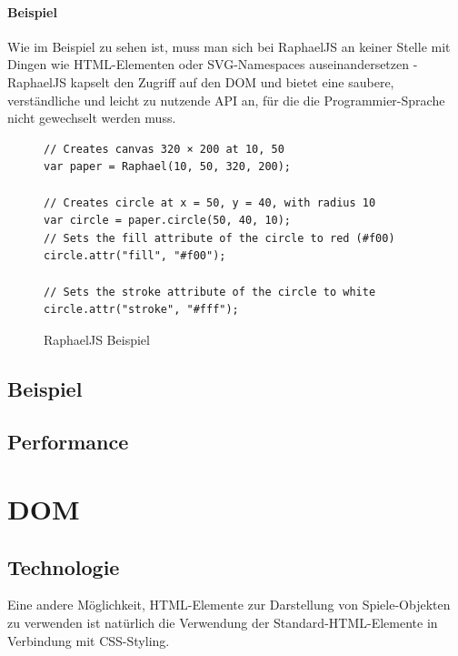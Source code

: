 \documentclass[a4paper, 12pt]{article}
\begin{document}
\paragraph{Beispiel}
Wie im Beispiel zu sehen ist, muss man sich bei RaphaelJS an keiner Stelle mit Dingen wie HTML-Elementen oder SVG-Namespaces auseinandersetzen - RaphaelJS kapselt den Zugriff auf den DOM und bietet eine saubere, verständliche und leicht zu nutzende API an, für die die Programmier-Sprache nicht gewechselt werden muss. 
\begin{figure}[h!]
	\begin{verbatim}
// Creates canvas 320 × 200 at 10, 50
var paper = Raphael(10, 50, 320, 200);

// Creates circle at x = 50, y = 40, with radius 10
var circle = paper.circle(50, 40, 10);
// Sets the fill attribute of the circle to red (#f00)
circle.attr("fill", "#f00");

// Sets the stroke attribute of the circle to white
circle.attr("stroke", "#fff");	
	\end{verbatim}
	\caption{RaphaelJS Beispiel}
	\label{raphaeljs_example}
\end{figure}
\subsection{Beispiel}
\subsection{Performance}
\newpage
\section{DOM}
\subsection{Technologie}
Eine andere Möglichkeit, HTML-Elemente zur Darstellung von Spiele-Objekten zu verwenden ist natürlich die Verwendung der Standard-HTML-Elemente in Verbindung mit CSS-Styling.
\end{document}
